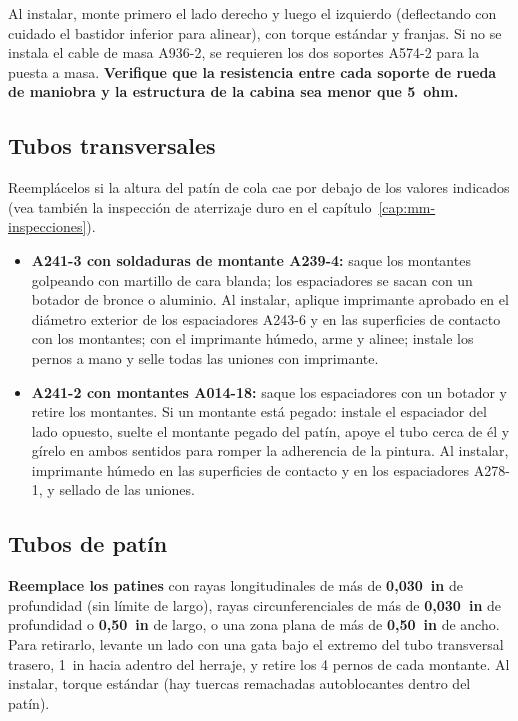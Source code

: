 Al instalar, monte primero el lado derecho y luego el izquierdo (deflectando con cuidado el bastidor inferior para alinear), con torque estándar y franjas. Si no se instala el cable de masa A936-2, se requieren los dos soportes A574-2 para la puesta a masa. \textbf{Verifique que la resistencia entre cada soporte de rueda de maniobra y la estructura de la cabina sea menor que 5~ohm.}

\subsection{Tubos transversales}

Reemplácelos si la altura del patín de cola cae por debajo de los valores indicados (vea también la inspección de aterrizaje duro en el capítulo~\ref{cap:mm-inspecciones}).

\begin{itemize}
\item \textbf{A241-3 con soldaduras de montante A239-4:} saque los montantes golpeando con martillo de cara blanda; los espaciadores se sacan con un botador de bronce o aluminio. Al instalar, aplique imprimante aprobado en el diámetro exterior de los espaciadores A243-6 y en las superficies de contacto con los montantes; con el imprimante húmedo, arme y alinee; instale los pernos a mano y selle todas las uniones con imprimante.
\item \textbf{A241-2 con montantes A014-18:} saque los espaciadores con un botador y retire los montantes. Si un montante está pegado: instale el espaciador del lado opuesto, suelte el montante pegado del patín, apoye el tubo cerca de él y gírelo en ambos sentidos para romper la adherencia de la pintura. Al instalar, imprimante húmedo en las superficies de contacto y en los espaciadores A278-1, y sellado de las uniones.
\end{itemize}

\subsection{Tubos de patín}

\textbf{Reemplace los patines} con rayas longitudinales de más de \textbf{0,030~in} de profundidad (sin límite de largo), rayas circunferenciales de más de \textbf{0,030~in} de profundidad o \textbf{0,50~in} de largo, o una zona plana de más de \textbf{0,50~in} de ancho. Para retirarlo, levante un lado con una gata bajo el extremo del tubo transversal trasero, 1~in hacia adentro del herraje, y retire los 4 pernos de cada montante. Al instalar, torque estándar (hay tuercas remachadas autoblocantes dentro del patín).

